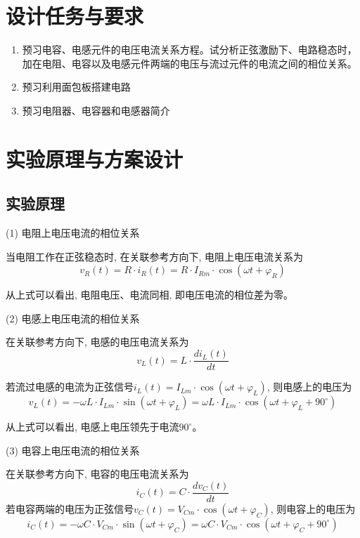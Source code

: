 \documentclass[10pt, a4paper]{article} %
\begin{document}
\section{设计任务与要求}

\begin{enumerate}[leftmargin=50pt,label=(\arabic*)] %
    \item 预习电容、电感元件的电压电流关系方程。试分析正弦激励下、电路稳态时，加在电阻、电容以及电感元件两端的电压与流过元件的电流之间的相位关系。
    \item 预习利用面包板搭建电路
    \item 预习电阻器、电容器和电感器简介
\end{enumerate}

\section{实验原理与方案设计}
\subsection{实验原理}
(1) 电阻上电压电流的相位关系
\vspace{0.5cm}

当电阻工作在正弦稳态时, 在关联参考方向下, 电阻上电压电流关系为
$$
v_R(t) = R \cdot i_{R}(t) = R \cdot I_{Rm} \cdot \cos(\omega t + \varphi_{R})
$$

从上式可以看出, 电阻电压、电流同相, 即电压电流的相位差为零。
\vspace{0.5cm}

(2) 电感上电压电流的相位关系
\vspace{0.5cm}

在关联参考方向下, 电感的电压电流关系为
$$
v_L(t) = L \cdot \frac{di_{L}(t)}{dt}
$$

若流过电感的电流为正弦信号$i_{L}(t) = I_{Lm} \cdot \cos(\omega t + \varphi_{L})$, 则电感上的电压为
$$
v_L(t) = -\omega L \cdot I_{Lm} \cdot \sin(\omega t + \varphi_{L}) = \omega L \cdot I_{Lm} \cdot \cos(\omega t + \varphi_{L} + 90^{\circ})
$$

从上式可以看出, 电感上电压领先于电流$90^{\circ}$。
\vspace{0.5cm}

(3) 电容上电压电流的相位关系
\vspace{0.5cm}

在关联参考方向下, 电容的电压电流关系为
$$
i_{C}(t) = C \cdot \frac{dv_{C}(t)}{dt}
$$
若电容两端的电压为正弦信号$v_{C}(t) = V_{Cm} \cdot \cos(\omega t + \varphi_{C})$, 则电容上的电压为
$$
i_{C}(t) = -\omega C \cdot V_{Cm} \cdot \sin(\omega t + \varphi_{C}) = \omega C \cdot V_{Cm} \cdot \cos(\omega t + \varphi_{C} + 90^{\circ})
$$
\end{document}
